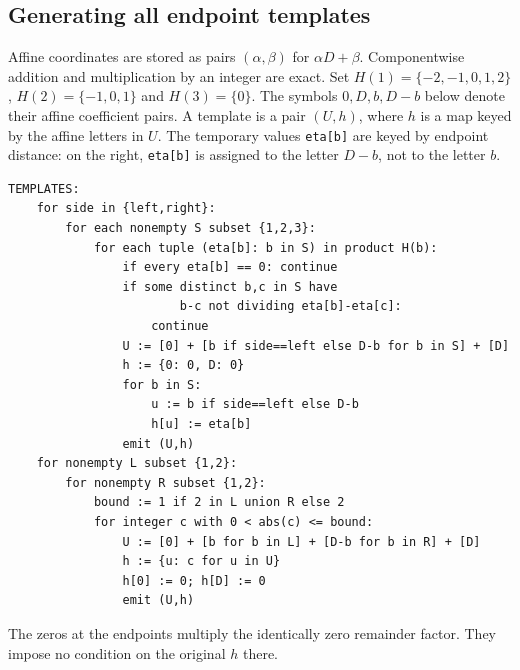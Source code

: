 \subsection{Generating all endpoint templates}
Affine coordinates are stored as pairs $(\alpha,\beta)$ for
$\alpha D+\beta$. Componentwise addition and multiplication by an
integer are exact. Set $H(1)=\{-2,-1,0,1,2\}$,
$H(2)=\{-1,0,1\}$ and $H(3)=\{0\}$.
The symbols $0,D,b,D-b$ below denote their affine coefficient pairs.
A template is a pair $(U,h)$, where $h$ is a map keyed by the affine
letters in $U$. The temporary values \texttt{eta[b]} are keyed by
endpoint distance: on the right, \texttt{eta[b]} is assigned to the
letter $D-b$, not to the letter $b$.
\begin{Verbatim}[fontsize=\small]
TEMPLATES:
    for side in {left,right}:
        for each nonempty S subset {1,2,3}:
            for each tuple (eta[b]: b in S) in product H(b):
                if every eta[b] == 0: continue
                if some distinct b,c in S have
                        b-c not dividing eta[b]-eta[c]:
                    continue
                U := [0] + [b if side==left else D-b for b in S] + [D]
                h := {0: 0, D: 0}
                for b in S:
                    u := b if side==left else D-b
                    h[u] := eta[b]
                emit (U,h)
    for nonempty L subset {1,2}:
        for nonempty R subset {1,2}:
            bound := 1 if 2 in L union R else 2
            for integer c with 0 < abs(c) <= bound:
                U := [0] + [b for b in L] + [D-b for b in R] + [D]
                h := {u: c for u in U}
                h[0] := 0; h[D] := 0
                emit (U,h)
\end{Verbatim}
The zeros at the endpoints multiply the identically zero remainder
factor. They impose no condition on the original $h$ there.

